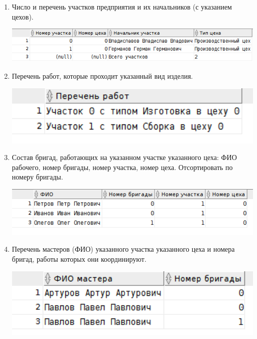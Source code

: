 \begin{enumerate}
    \item Число и перечень участков предприятия и их начальников (с указанием цехов).

    

    \includegraphics[width=14cm]{./screenshots/results/result4.png}

    \item Перечень работ, которые проходит указанный вид изделия.

    

    \includegraphics[width=14cm]{./screenshots/results/result5.png}

    \item Состав бригад, работающих на указанном участке указанного цеха: ФИО рабочего, номер бригады, номер участка, номер цеха. Отсортировать по номеру бригады.

    

    \includegraphics[width=14cm]{./screenshots/results/result6.png}

    \item Перечень мастеров (ФИО) указанного участка указанного цеха и номера бригад, работы которых они координируют.

    

    \includegraphics[width=14cm]{./screenshots/results/result7.png}


\end{enumerate}
